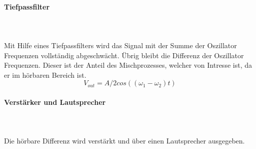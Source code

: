 \paragraph{Tiefpassfilter}\mbox{}\\ 
\\Mit Hilfe eines Tiefpassfilters wird das Signal mit der Summe der Oszillator Frequenzen vollständig abgeschwächt. Übrig bleibt die Differenz der Oszillator Frequenzen. Dieser ist der Anteil des Mischprozesses, welcher von Intresse ist, da er im hörbaren Bereich ist.
\begin{equation}
V_{out} = A/2cos((\omega_{1}-\omega_{2})t) 
\label{equ:mischer_trigo}
\end{equation}

\paragraph{Verstärker und  Lautsprecher}\mbox{}\\ 
\\Die hörbare Differenz wird verstärkt und über einen Lautsprecher ausgegeben.
